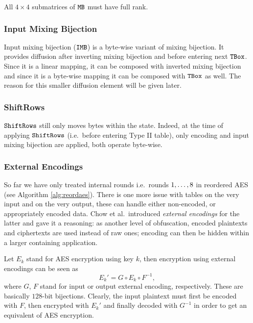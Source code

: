 	\begin{note}
	\label{note:fullrank}
		All $4\times4$ submatrices of $\texttt{MB}$ must have full rank.
	\end{note}
	

\subsubsection{Input Mixing Bijection}
	
	Input mixing bijection ($\texttt{IMB}$) is a byte-wise variant of mixing bijection. It provides diffusion after inverting mixing bijection and before entering next $\texttt{TBox}$. Since it is a linear mapping, it can be composed with inverted mixing bijection and since it is a byte-wise mapping it can be composed with $\texttt{TBox}$ as well. The reason for this smaller diffusion element will be given later.

\subsubsection{ShiftRows}
	
	$\texttt{ShiftRows}$ still only moves bytes within the state. Indeed, at the time of applying $\texttt{ShiftRows}$ (i.e.\ before entering Type II table), only encoding and input mixing bijection are applied, both operate byte-wise.

\subsubsection{External Encodings}
	
	So far we have only treated internal rounds i.e.\ rounds $1 , \ldots , 8$ in reordered AES (see Algorithm \ref{alg:reordaes}). There is one more issue with tables on the very input and on the very output, these can handle either non-encoded, or appropriately encoded data. Chow et al.\ introduced {\em external encodings} for the latter and gave it a reasoning: as another level of obfuscation, encoded plaintexts and ciphertexts are used instead of raw ones; encoding can then be hidden within a larger containing application. %
	
	Let $E_k$ stand for AES encryption using key $k$, then encryption using external encodings can be seen as
	\begin{equation}
	\label{eq:extenc}
		E_k' = G \circ E_k \circ F^{-1} ,
	\end{equation}
	where $G$, $F$ stand for input or output external encoding, respectively. These are basically $128$-bit bijections. Clearly, the input plaintext must first be encoded with $F$, then encrypted with $E_k'$ and finally decoded with $G^{-1}$ in order to get an equivalent of AES encryption.
	
